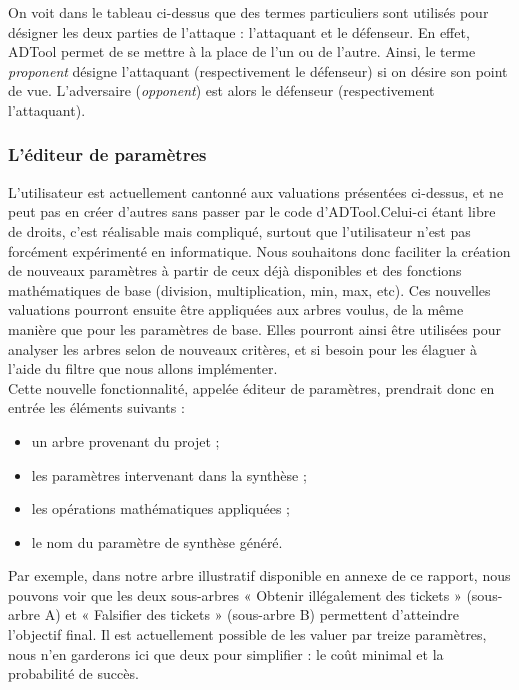On voit dans le tableau ci-dessus que des termes particuliers sont utilisés pour désigner les deux parties de l'attaque : l'attaquant et le défenseur. En effet, ADTool permet de se mettre à la place de l'un ou de l'autre. Ainsi, le terme \textit{proponent} désigne l'attaquant (respectivement le défenseur) si on désire son point de vue. L'adversaire (\textit{opponent}) est alors le défenseur (respectivement l'attaquant). %

\subsubsection{L'éditeur de paramètres}

L'utilisateur est actuellement cantonné aux valuations présentées ci-dessus, et ne peut pas en créer d'autres sans passer par le code d'ADTool.Celui-ci étant libre de droits, c'est réalisable mais compliqué, surtout que l'utilisateur n'est pas forcément expérimenté en informatique. %
Nous souhaitons donc faciliter la création de nouveaux paramètres à partir de ceux déjà disponibles et des fonctions mathématiques de base (division, multiplication, min, max, etc). Ces nouvelles valuations pourront ensuite être appliquées aux arbres voulus, de la même manière que pour les paramètres de base. Elles pourront ainsi être utilisées pour analyser les arbres selon de nouveaux critères, et si besoin pour les élaguer à l'aide du filtre que nous allons implémenter.\\

Cette nouvelle fonctionnalité, appelée éditeur de paramètres, prendrait donc en entrée les éléments suivants :
\begin{itemize}[label=,font=\color{magenta},parsep=0cm,itemsep=0cm, leftmargin=0cm]
\item un arbre provenant du projet ;
\item les paramètres intervenant dans la synthèse ;
\item les opérations mathématiques appliquées ;
\item le nom du paramètre de synthèse généré.
\end{itemize}

Par exemple, dans notre arbre illustratif disponible en annexe de ce rapport, nous pouvons voir que les deux sous-arbres « Obtenir illégalement des tickets » (sous-arbre A) et « Falsifier des tickets » (sous-arbre B) permettent d'atteindre l'objectif final. Il est actuellement possible de les valuer par treize paramètres, nous n'en garderons ici que deux pour simplifier : le coût minimal et la probabilité de succès.\\

